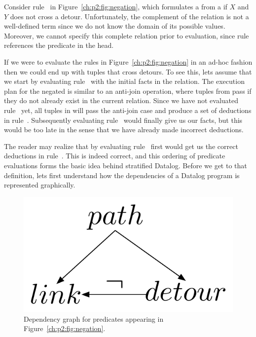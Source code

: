 Consider rule~ in Figure~\ref{ch:p2:fig:negation}, which formulates a
 from a  if $X$ and $Y$ does not cross a detour.
Unfortunately, the complement of the  relation is not a well-defined
term since we do not know the domain of its possible values.  Moreover, we cannot
specify this complete relation prior to evaluation, since rule~
references the  predicate in the head.  

If we were to evaluate the rules in Figure~\ref{ch:p2:fig:negation} in an
ad-hoc fashion then we could end up with  tuples that cross detours.
To see this, lets assume that we start by evaluating rule~ with the
initial facts in the  relation.  The execution plan for the negated
 is similar to an anti-join operation, where tuples from 
pass if they do not already exist in the current  relation.  Since
we have not evaluated rule~ yet, all tuples in  will pass the
anti-join case and produce a set of  deductions in rule~.
Subsequently evaluating rule~ would finally give us our 
facts, but this would be too late in the sense that we have already made
incorrect deductions.

The reader may realize that by evaluating rule~ first would get us the
correct deductions in rule~.  This is indeed correct, and this ordering
of predicate evaluations forms the basic idea behind stratified Datalog.
Before we get to that definition, lets first understand how the dependencies of
a Datalog program is represented graphically.

\begin{figure} 
\ssp
\begin{center}
\includegraphics[scale=1]{figures/dependency-graph}
\caption{\label{ch:p2:fig:dependency}Dependency graph for predicates 
appearing in Figure~\ref{ch:p2:fig:negation}.}
\end{center} 
\end{figure}

